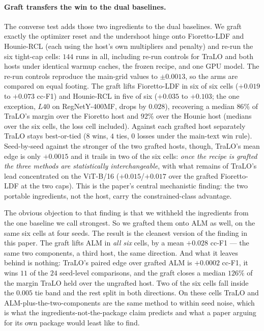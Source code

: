 \documentclass[10pt]{article}
\begin{document}
\paragraph{Graft transfers the win to the dual baselines.}
The converse test adds those two ingredients to the dual baselines. We
graft exactly the optimizer reset and the undershoot hinge onto
Fioretto-LDF and Hounie-RCL (each using the host's own multipliers and
penalty) and re-run the six tight-cap cells: $144$ runs in all, including
re-run controls for TraLO and both hosts under identical warmup caches,
the frozen recipe, and one GPU model. The re-run controls reproduce the
main-grid values to $\pm0.0013$, so the arms are compared on equal
footing. The graft lifts Fioretto-LDF in six of six cells ($+0.019$ to
$+0.073$ cc-F1) and Hounie-RCL in five of six ($+0.035$ to $+0.103$; the
one exception, $L40$ on RegNet{Y-400MF}, drops by $0.028$), recovering a median
$86\%$ of TraLO's margin over the Fioretto host and $92\%$ over the
Hounie host (medians over the six cells, the loss cell included). Against
each grafted host separately TraLO stays best-or-tied ($8$ wins, $4$
ties, $0$ losses under the main-text win rule). Seed-by-seed against the
stronger of the two grafted hosts, though, TraLO's mean edge is only
$+0.0015$ and it trails in two of the six cells: \emph{once the recipe is
grafted the three methods are statistically interchangeable}, with what
remains of TraLO's lead concentrated on the ViT-B/16 ($+0.015$/$+0.017$
over the grafted Fioretto-LDF at the two caps). This is the paper's
central mechanistic finding: the two portable ingredients, not the host,
carry the constrained-class advantage.

{The obvious objection to that finding is that we withheld the ingredients from
the one baseline we call strongest. So we grafted them onto ALM as well, on the
same six cells at four seeds. The result is the cleanest version of the finding
in this paper. The graft lifts ALM in \emph{all six} cells, by a mean $+0.028$
cc-F1 --- the same two components, a third host, the same direction. And what it
leaves behind is nothing: TraLO's paired edge over grafted ALM is $+0.0002$
cc-F1, it wins $11$ of the $24$ seed-level comparisons, and the graft closes a
median $126\%$ of the margin TraLO held over the ungrafted host. Two of the six
cells fall inside the $0.005$ tie band and the rest split in both directions.
On these cells TraLO and ALM-plus-the-two-components are the same method to
within seed noise, which is what the ingredients-not-the-package claim predicts
and what a paper arguing for its own package would least like to find.}
\end{document}
